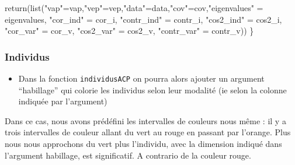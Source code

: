 \documentclass[
]{article}
\newenvironment{Shaded}{\begin{snugshade}}{\end{snugshade}}
\newcommand{\FunctionTok}[1]{\textcolor[rgb]{0.00,0.00,0.00}{#1}}
\newcommand{\NormalTok}[1]{#1}
\newcommand{\OtherTok}[1]{\textcolor[rgb]{0.56,0.35,0.01}{#1}}
\newcommand{\StringTok}[1]{\textcolor[rgb]{0.31,0.60,0.02}{#1}}
\providecommand{\tightlist}{%
  \setlength{\itemsep}{0pt}\setlength{\parskip}{0pt}}
\begin{document}
\begin{Shaded}
\begin{Highlighting}[]
  \FunctionTok{return}\NormalTok{(}\FunctionTok{list}\NormalTok{(}\StringTok{"vap"}\OtherTok{=}\NormalTok{vap,}\StringTok{"vep"}\OtherTok{=}\NormalTok{vep,}\StringTok{"data"}\OtherTok{=}\NormalTok{data,}\StringTok{"cov"}\OtherTok{=}\NormalTok{cov,}\StringTok{"eigenvalues"} \OtherTok{=}\NormalTok{ eigenvalues, }
              \StringTok{"cor\_ind"} \OtherTok{=}\NormalTok{ cor\_i, }\StringTok{"contr\_ind"} \OtherTok{=}\NormalTok{ contr\_i, }\StringTok{"cos2\_ind"} \OtherTok{=}\NormalTok{ cos2\_i,}
              \StringTok{"cor\_var"} \OtherTok{=}\NormalTok{ cor\_v, }\StringTok{"cos2\_var"} \OtherTok{=}\NormalTok{ cos2\_v, }\StringTok{"contr\_var"} \OtherTok{=}\NormalTok{ contr\_v))}
\NormalTok{\}}
\end{Highlighting}
\end{Shaded}

\hypertarget{individus}{%
\subsubsection{Individus}\label{individus}}

\begin{itemize}
\tightlist
\item
  Dans la fonction \texttt{individusACP} on pourra alors ajouter un
  argument ``habillage'' qui colorie les individus selon leur modalité
  (ie selon la colonne indiquée par l'argument)
\end{itemize}

Dans ce cas, nous avons prédéfini les intervalles de couleurs nous même
: il y a trois intervalles de couleur allant du vert au rouge en passant
par l'orange. Plus nous nous approchons du vert plus l'individu, avec la
dimension indiqué dans l'argument habillage, est significatif. A
contrario de la couleur rouge.
\end{document}
